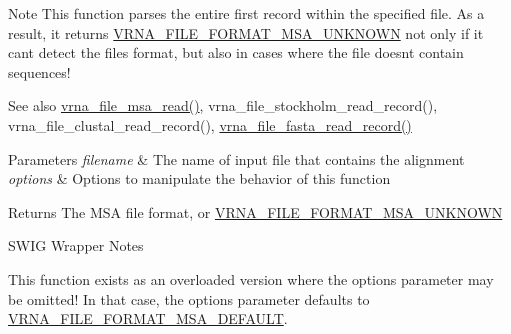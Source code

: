 \begin{DoxyNote}{Note}
This function parses the entire first record within the specified file. As a result, it returns \mbox{\hyperlink{group__file__utils_gabdc948f547e550125de3e7c65878400c}{V\+R\+N\+A\+\_\+\+F\+I\+L\+E\+\_\+\+F\+O\+R\+M\+A\+T\+\_\+\+M\+S\+A\+\_\+\+U\+N\+K\+N\+O\+WN}} not only if it can\textquotesingle{}t detect the file\textquotesingle{}s format, but also in cases where the file doesn\textquotesingle{}t contain sequences!
\end{DoxyNote}
\begin{DoxySeeAlso}{See also}
\mbox{\hyperlink{group__file__utils_ga08a01c40ac5f5e0e04e9ae2258c99aa6}{vrna\+\_\+file\+\_\+msa\+\_\+read()}}, vrna\+\_\+file\+\_\+stockholm\+\_\+read\+\_\+record(), vrna\+\_\+file\+\_\+clustal\+\_\+read\+\_\+record(), \mbox{\hyperlink{group__file__utils_ga8cfb7e271efc9e1f34640acb85475639}{vrna\+\_\+file\+\_\+fasta\+\_\+read\+\_\+record()}}
\end{DoxySeeAlso}

\begin{DoxyParams}{Parameters}
{\em filename} & The name of input file that contains the alignment \\
\hline
{\em options} & Options to manipulate the behavior of this function \\
\hline
\end{DoxyParams}
\begin{DoxyReturn}{Returns}
The M\+SA file format, or \mbox{\hyperlink{group__file__utils_gabdc948f547e550125de3e7c65878400c}{V\+R\+N\+A\+\_\+\+F\+I\+L\+E\+\_\+\+F\+O\+R\+M\+A\+T\+\_\+\+M\+S\+A\+\_\+\+U\+N\+K\+N\+O\+WN}}
\end{DoxyReturn}
\begin{DoxyRefDesc}{S\+W\+I\+G Wrapper Notes}
\item[\mbox{\hyperlink{wrappers__wrappers000059}{S\+W\+I\+G Wrapper Notes}}]This function exists as an overloaded version where the {\ttfamily options} parameter may be omitted! In that case, the {\ttfamily options} parameter defaults to \mbox{\hyperlink{group__file__utils_ga4acc255373831856a8417b68de8a94c0}{V\+R\+N\+A\+\_\+\+F\+I\+L\+E\+\_\+\+F\+O\+R\+M\+A\+T\+\_\+\+M\+S\+A\+\_\+\+D\+E\+F\+A\+U\+LT}}. \end{DoxyRefDesc}
\mbox{\label{group__file__utils_ga0c90faf1515ce0b16620036b1055ff1e}} 
